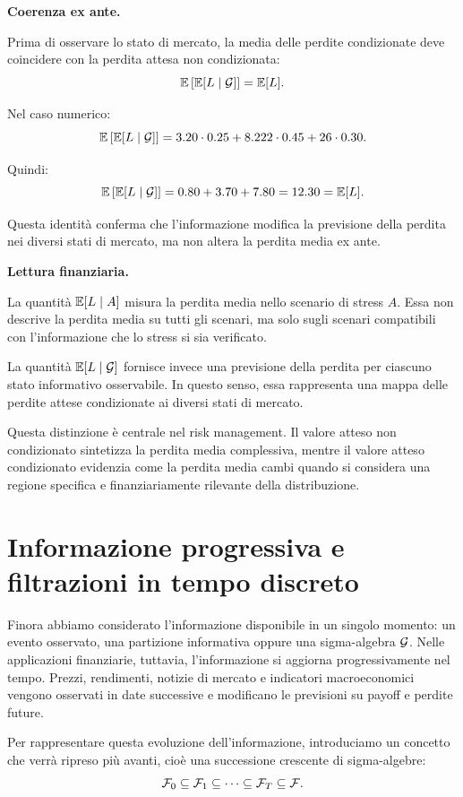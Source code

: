 \medskip

\noindent
\textbf{Coerenza ex ante.}

Prima di osservare lo stato di mercato, la media delle perdite condizionate
deve coincidere con la perdita attesa non condizionata:
\[
\mathbb{E}\left[
\mathbb{E}[L\mid\mathcal{G}]
\right]
=
\mathbb{E}[L].
\]

Nel caso numerico:
\[
\mathbb{E}\left[
\mathbb{E}[L\mid\mathcal{G}]
\right]
=
3.20\cdot0.25
+
8.222\cdot0.45
+
26\cdot0.30.
\]

Quindi:
\[
\mathbb{E}\left[
\mathbb{E}[L\mid\mathcal{G}]
\right]
=
0.80+3.70+7.80
=
12.30
=
\mathbb{E}[L].
\]

Questa identit\`{a} conferma che l'informazione modifica la previsione della
perdita nei diversi stati di mercato, ma non altera la perdita media ex ante.

\medskip

\noindent
\textbf{Lettura finanziaria.}

La quantit\`{a} $\mathbb{E}[L\mid A]$ misura la perdita media nello scenario di
stress $A$. Essa non descrive la perdita media su tutti gli scenari, ma solo
sugli scenari compatibili con l'informazione che lo stress si sia verificato.

La quantit\`{a} $\mathbb{E}[L\mid\mathcal{G}]$ fornisce invece una previsione
della perdita per ciascuno stato informativo osservabile. In questo senso,
essa rappresenta una mappa delle perdite attese condizionate ai diversi stati
di mercato.

Questa distinzione \`{e} centrale nel risk management. Il valore atteso
non condizionato sintetizza la perdita media complessiva, mentre il valore
atteso condizionato evidenzia come la perdita media cambi quando si considera
una regione specifica e finanziariamente rilevante della distribuzione.

\section{Informazione progressiva e filtrazioni in tempo discreto}

Finora abbiamo considerato l'informazione disponibile in un singolo momento:
un evento osservato, una partizione informativa oppure una sigma-algebra
$\mathcal{G}$. Nelle applicazioni finanziarie, tuttavia, l'informazione si
aggiorna progressivamente nel tempo. Prezzi, rendimenti, notizie di mercato e
indicatori macroeconomici vengono osservati in date successive e modificano le
previsioni su payoff e perdite future.

Per rappresentare questa evoluzione dell'informazione, introduciamo un concetto che verr\`{a} ripreso pi\`{u} avanti, cio\`{e} una successione crescente di sigma-algebre:
\[
\mathcal{F}_0
\subseteq
\mathcal{F}_1
\subseteq
\cdots
\subseteq
\mathcal{F}_T
\subseteq
\mathcal{F}.
\]

